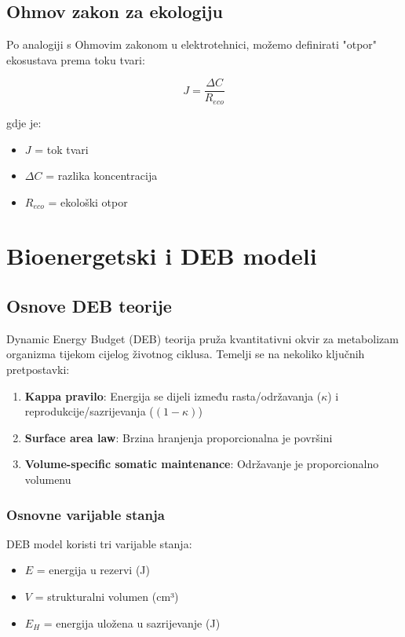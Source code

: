 \documentclass[11pt,oneside]{book}
\begin{document}
\subsection{Ohmov zakon za ekologiju}

Po analogiji s Ohmovim zakonom u elektrotehnici, možemo definirati "otpor" ekosustava prema toku tvari:

\begin{equation}
	J = \frac{\Delta C}{R_{eco}}
\end{equation}

gdje je:
\begin{itemize}
	\item $J$ = tok tvari
	\item $\Delta C$ = razlika koncentracija
	\item $R_{eco}$ = ekološki otpor
\end{itemize}

\section{Bioenergetski i DEB modeli}

\subsection{Osnove DEB teorije}

Dynamic Energy Budget (DEB) teorija pruža kvantitativni okvir za metabolizam organizma tijekom cijelog životnog ciklusa. Temelji se na nekoliko ključnih pretpostavki:

\begin{enumerate}
	\item \textbf{Kappa pravilo}: Energija se dijeli između rasta/održavanja ($\kappa$) i reprodukcije/sazrijevanja ($(1-\kappa)$)
	\item \textbf{Surface area law}: Brzina hranjenja proporcionalna je površini
	\item \textbf{Volume-specific somatic maintenance}: Održavanje je proporcionalno volumenu
\end{enumerate}

\subsubsection{Osnovne varijable stanja}

DEB model koristi tri varijable stanja:
\begin{itemize}
	\item $E$ = energija u rezervi (J)
	\item $V$ = strukturalni volumen (cm³)
	\item $E_H$ = energija uložena u sazrijevanje (J)
\end{itemize}
\end{document}
